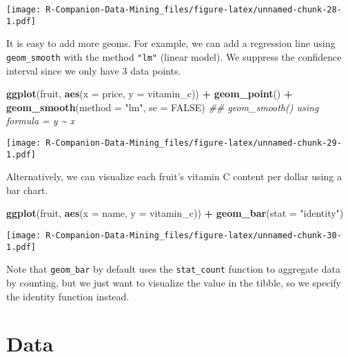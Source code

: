 \documentclass[
  notitlepage]{book}
\newenvironment{Shaded}{\begin{snugshade}}{\end{snugshade}}
\newcommand{\CommentTok}[1]{\textcolor[rgb]{0.56,0.35,0.01}{\textit{#1}}}
\newcommand{\DataTypeTok}[1]{\textcolor[rgb]{0.13,0.29,0.53}{#1}}
\newcommand{\KeywordTok}[1]{\textcolor[rgb]{0.13,0.29,0.53}{\textbf{#1}}}
\newcommand{\NormalTok}[1]{#1}
\newcommand{\OperatorTok}[1]{\textcolor[rgb]{0.81,0.36,0.00}{\textbf{#1}}}
\newcommand{\OtherTok}[1]{\textcolor[rgb]{0.56,0.35,0.01}{#1}}
\newcommand{\StringTok}[1]{\textcolor[rgb]{0.31,0.60,0.02}{#1}}
\begin{document}
\texttt{[image: R-Companion-Data-Mining\_files/figure-latex/unnamed-chunk-28-1.pdf]}

It is easy to add more geoms. For example, we can add a regression line
using \texttt{geom\_smooth} with the method \texttt{"lm"} (linear model). We suppress
the confidence interval since we only have 3 data points.

\begin{Shaded}
\begin{Highlighting}[]
\KeywordTok{ggplot}\NormalTok{(fruit, }\KeywordTok{aes}\NormalTok{(}\DataTypeTok{x =}\NormalTok{ price, }\DataTypeTok{y =}\NormalTok{ vitamin\_c)) }\OperatorTok{+}\StringTok{ }
\StringTok{  }\KeywordTok{geom\_point}\NormalTok{() }\OperatorTok{+}
\StringTok{  }\KeywordTok{geom\_smooth}\NormalTok{(}\DataTypeTok{method =} \StringTok{"lm"}\NormalTok{, }\DataTypeTok{se =} \OtherTok{FALSE}\NormalTok{)}
\CommentTok{\#\# \textasciigrave{}geom\_smooth()\textasciigrave{} using formula = \textquotesingle{}y \textasciitilde{} x\textquotesingle{}}
\end{Highlighting}
\end{Shaded}

\texttt{[image: R-Companion-Data-Mining\_files/figure-latex/unnamed-chunk-29-1.pdf]}

Alternatively, we can visualize each fruit's vitamin C content per
dollar using a bar chart.

\begin{Shaded}
\begin{Highlighting}[]
\KeywordTok{ggplot}\NormalTok{(fruit, }\KeywordTok{aes}\NormalTok{(}\DataTypeTok{x =}\NormalTok{ name, }\DataTypeTok{y =}\NormalTok{ vitamin\_c)) }\OperatorTok{+}\StringTok{ }
\StringTok{  }\KeywordTok{geom\_bar}\NormalTok{(}\DataTypeTok{stat =} \StringTok{"identity"}\NormalTok{)}
\end{Highlighting}
\end{Shaded}

\texttt{[image: R-Companion-Data-Mining\_files/figure-latex/unnamed-chunk-30-1.pdf]}

Note that \texttt{geom\_bar} by default uses the \texttt{stat\_count} function to
aggregate data by counting, but we just want to visualize the value in
the tibble, so we specify the identity function instead.

\hypertarget{data}{%
\chapter{Data}\label{data}}
\end{document}
